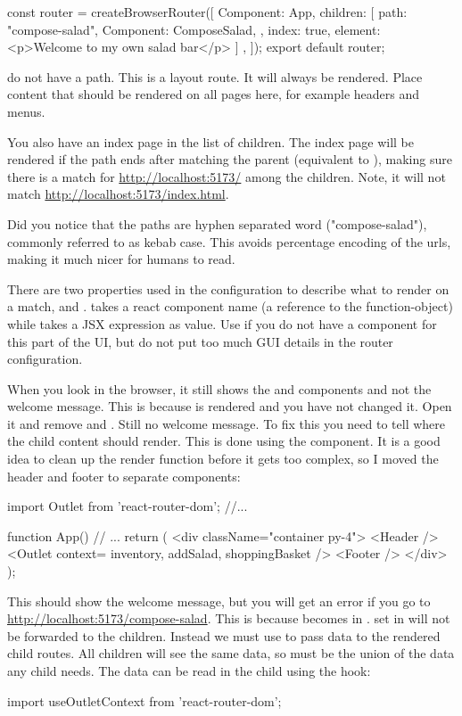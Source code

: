 \documentclass[fleqn, article, a4paper]{memoir}
\begin{document}
\begin{Assignments}
\begin{Code}
const router = createBrowserRouter([
  {
    Component: App,
    children: [
      {
        path: "compose-salad",
        Component: ComposeSalad,
      }, {
        index: true,
        element: <p>Welcome to my own salad bar</p>
      }]
  },
]);
export default router;
\end{Code}
\noindent {} do not have a path. This is a layout route. It will always be rendered. Place content that should be rendered on all pages here, for example headers and menus.

You also have an index page in the list of children. The index page will be rendered if the path ends after matching the parent (equivalent to ), making sure there is a match for \url{http://localhost:5173/} among the children. Note, it will not match \url{http://localhost:5173/index.html}.

Did you notice that the paths are hyphen separated word ("compose-salad"), commonly referred to as kebab case. This avoids percentage encoding of the urls, making it much nicer for humans to read.

There are two properties used in the configuration to describe what to render on a match,  and .  takes a react component name (a reference to the function-object) while  takes a JSX expression as value. Use  if you do not have a component for this part of the UI, but do not put too much GUI details in the router configuration.

When you look in the browser, it still shows the  and  components and not the welcome message. This is because  is rendered and you have not changed it. Open it and remove  and . Still no welcome message. To fix this you need to tell where the child content should render. This is done using the  component. It is a good idea to clean up the render function before it gets too complex, so I moved the header and footer to separate components:
\begin{Code}
import { Outlet } from 'react-router-dom';
//...

function App() {
  // ...
  return (
    <div className="container py-4">
      <Header />
      <Outlet context={{ inventory, addSalad, shoppingBasket }} />
      <Footer />
    </div>
  );
}
\end{Code}
\noindent This should show the welcome message, but you will get an error if you go to \url{http://localhost:5173/compose-salad}. This is because  becomes  in .  set in  will not be forwarded to the children. Instead we must use  to pass data to the rendered child routes. All children will see the same data, so  must be the union of the data any child needs. The data can be read in the child using the  hook:
\begin{Code}
import { useOutletContext } from 'react-router-dom';


\end{Code}
\end{Assignments}
\end{document}
